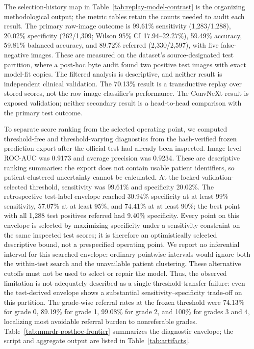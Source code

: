 \documentclass{ieeeaccess}
\begin{document}
The selection-history map in Table~\ref{tab:replay-model-contrast} is the organizing methodological output; the metric tables retain the counts needed to audit each result. The primary raw-image outcome is 99.61\% sensitivity (1,283/1,288), 20.02\% specificity (262/1,309; Wilson 95\% CI 17.94--22.27\%), 59.49\% accuracy, 59.81\% balanced accuracy, and 89.72\% referred (2,330/2,597), with five false-negative images. These are measured on the dataset's source-designated test partition, where a post-hoc byte audit found two positive test images with exact model-fit copies. The filtered analysis is descriptive, and neither result is independent clinical validation. The 70.13\% result is a transductive replay over stored scores, not the raw-image classifier's performance. The ConvNeXt result is exposed validation; neither secondary result is a head-to-head comparison with the primary test outcome.

To separate score ranking from the selected operating point, we computed threshold-free and threshold-varying diagnostics from the hash-verified frozen prediction export after the official test had already been inspected. Image-level ROC-AUC was 0.9173 and average precision was 0.9234. These are descriptive ranking summaries: the export does not contain usable patient identifiers, so patient-clustered uncertainty cannot be calculated. At the locked validation-selected threshold, sensitivity was 99.61\% and specificity 20.02\%. The retrospective test-label envelope reached 30.94\% specificity at at least 99\% sensitivity, 57.07\% at at least 95\%, and 74.41\% at at least 90\%; the best point with all 1,288 test positives referred had 9.40\% specificity. Every point on this envelope is selected by maximizing specificity under a sensitivity constraint on the same inspected test scores; it is therefore an optimistically selected descriptive bound, not a prespecified operating point. We report no inferential interval for this searched envelope: ordinary pointwise intervals would ignore both the within-test search and the unavailable patient clustering. These alternative cutoffs must not be used to select or repair the model. Thus, the observed limitation is not adequately described as a single threshold-transfer failure: even the test-derived envelope shows a substantial sensitivity--specificity trade-off on this partition. The grade-wise referral rates at the frozen threshold were 74.13\% for grade 0, 89.19\% for grade 1, 99.08\% for grade 2, and 100\% for grades 3 and 4, localizing most avoidable referral burden to nonreferable grades. Table~\ref{tab:mmrdr-posthoc-frontier} summarizes the diagnostic envelope; the script and aggregate output are listed in Table~\ref{tab:artifacts}.
\end{document}
